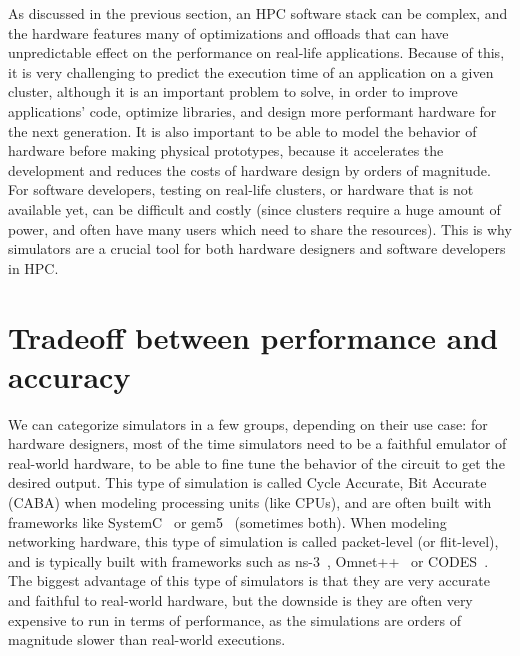As discussed in the previous section, an HPC software stack can be complex, and
the hardware features many of optimizations and offloads that can have
unpredictable effect on the performance on real-life applications. Because of
this, it is very challenging to predict the execution time of an application on
a given cluster, although it is an important problem to solve, in order to
improve applications' code, optimize libraries, and design more performant
hardware for the next generation. It is also important to be able to model the
behavior of hardware before making physical prototypes, because it accelerates
the development and reduces the costs of hardware design by orders of magnitude.
For software developers, testing on real-life clusters, or hardware that is not
available yet, can be difficult and costly (since clusters require a huge amount
of power, and often have many users which need to share the resources). This is
why simulators are a crucial tool for both hardware designers and software
developers in HPC.

\section{Tradeoff between performance and accuracy}

We can categorize simulators in a few groups, depending on their use case: for
hardware designers, most of the time simulators need to be a faithful emulator
of real-world hardware, to be able to fine tune the behavior of the circuit to
get the desired output. This type of simulation is called Cycle Accurate, Bit
Accurate (CABA) when modeling processing units (like CPUs), and are often built
with frameworks like SystemC~\cite{Cornet2008} or gem5~\cite{Menard2017}
(sometimes both). When modeling networking hardware, this type of simulation is
called packet-level (or flit-level), and is typically built with frameworks such
as ns-3~\cite{Riley2010}, Omnet++~\cite{Varga2001} or CODES~\cite{Jain2017}. The
biggest advantage of this type of simulators is that they are very accurate and
faithful to real-world hardware, but the downside is they are often very
expensive to run in terms of performance, as the simulations are orders of
magnitude slower than real-world executions.

